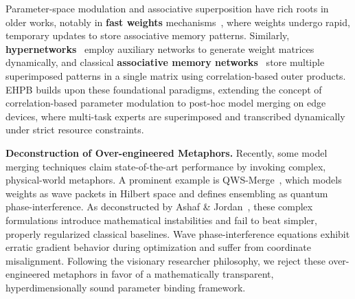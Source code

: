 Parameter-space modulation and associative superposition have rich roots in older works, notably in \textbf{fast weights} mechanisms~\cite{von1981correlation, ba2016using}, where weights undergo rapid, temporary updates to store associative memory patterns. Similarly, \textbf{hypernetworks}~\cite{ha2016hypernetworks} employ auxiliary networks to generate weight matrices dynamically, and classical \textbf{associative memory networks}~\cite{hopfield1982neural, kohonen1972correlation} store multiple superimposed patterns in a single matrix using correlation-based outer products. EHPB builds upon these foundational paradigms, extending the concept of correlation-based parameter modulation to post-hoc model merging on edge devices, where multi-task experts are superimposed and transcribed dynamically under strict resource constraints.

\textbf{Deconstruction of Over-engineered Metaphors.} Recently, some model merging techniques claim state-of-the-art performance by invoking complex, physical-world metaphors. A prominent example is QWS-Merge~\cite{chosetme2024qws}, which models weights as wave packets in Hilbert space and defines ensembling as quantum phase-interference. As deconstructed by Ashaf \& Jordan~\cite{ashaf2024overengineered}, these complex formulations introduce mathematical instabilities and fail to beat simpler, properly regularized classical baselines. Wave phase-interference equations exhibit erratic gradient behavior during optimization and suffer from coordinate misalignment. Following the visionary researcher philosophy, we reject these over-engineered metaphors in favor of a mathematically transparent, hyperdimensionally sound parameter binding framework.
